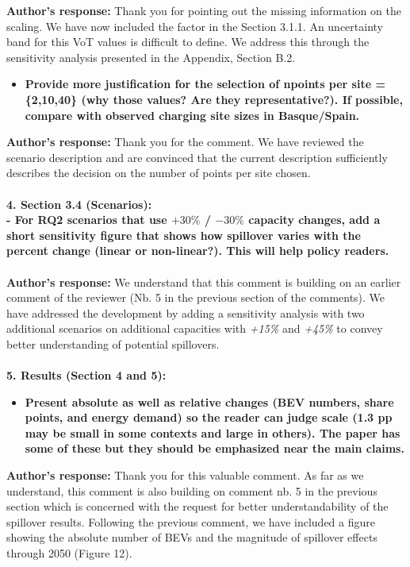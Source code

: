 \documentclass[11pt]{article}
\begin{document}
\color{authorblue}
\textbf{Author's response:}  Thank you for pointing out the missing information on the scaling. We have now included the factor in the Section 3.1.1. An uncertainty band for this VoT values is difficult to define. We address this through the sensitivity analysis presented in the Appendix, Section B.2.
\color{reviewergrey}
\begin{itemize}
    \item[o]\textbf{ Provide more justification for the selection of npoints per site = \{2,10,40\} (why those values? Are they representative?). If possible, compare with observed charging site sizes in Basque/Spain.}
\end{itemize}
\color{authorblue}\textcolor{authorblue}{\textbf{Author's response:}} Thank you for the comment. We have reviewed the scenario description and are convinced that the current description sufficiently describes the decision on the number of points per site chosen.\\\\
\color{reviewergrey}
\textbf{4. Section 3.4 (Scenarios): \\
- For RQ2 scenarios that use $+30\%$ / $-30\%$ capacity changes, add a short sensitivity figure that shows how spillover varies with the percent change (linear or non-linear?). This will help policy readers.} \\\\
\color{authorblue}
\noindent \textcolor{authorblue}{\textbf{Author's response:}} We understand that this comment is building on an earlier comment of the reviewer (Nb. 5 in the previous section of the comments). We have addressed the development by adding a sensitivity analysis with two additional scenarios on additional capacities with \textit{+15\%} and \textit{+45\%} to convey better understanding of potential spillovers.\\\\
\color{reviewergrey}
\textbf{5. Results (Section 4 and 5):} \\
\begin{itemize}
    \item[o]\textbf{ Present absolute as well as relative changes (BEV numbers, share points, and energy demand) so the reader can judge scale (1.3 pp may be small in some contexts and large in others). The paper has some of these but they should be emphasized near the main claims.}
\end{itemize}
\color{authorblue}
\noindent \textcolor{authorblue}{\textbf{Author's response:}} Thank you for this valuable comment. As far as we understand, this comment is also building on comment nb. 5 in the previous section which is concerned with the request for better understandability of the spillover results. Following the previous comment, we have included a figure showing the absolute number of BEVs and the magnitude of spillover effects through 2050 (Figure 12).
\end{document}
